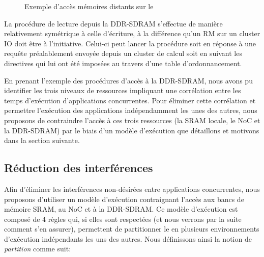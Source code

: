 \documentclass[main.tex]{subfiles}
\begin{document}
\begin{figure}
\begin{center}
    
	\caption{Exemple d'accès mémoires distants sur le \mppalong}
	\label{resumeFr_MPPAremoteMem}
\end{center}
\end{figure}
La procédure de lecture depuis la DDR-SDRAM s'effectue de manière relativement symétrique à celle d'écriture, à la différence qu'un RM sur un cluster IO doit être à l'initiative. Celui-ci peut lancer la procédure soit en réponse à une requête préalablement envoyée depuis un cluster de calcul soit en suivant les directives qui lui ont été imposées au travers d'une table d'ordonnancement.

En prenant l'exemple des procédures d'accès à la DDR-SDRAM, nous avons pu identifier les trois niveaux de ressources impliquant une corrélation entre les temps d'exécution d'applications concurrentes. Pour éliminer cette corrélation et permettre l'exécution des applications indépendamment les unes des autres, nous proposons de contraindre l'accès à ces trois ressources (la SRAM locale, le NoC et la DDR-SDRAM) par le biais d'un modèle d'exécution que détaillons et motivons dans la section suivante.



\subsection{Réduction des interférences}
\label{ssec_resumeFr_reducInterference}
Afin d'éliminer les interférences non-désirées entre applications concurrentes, nous proposons d'utiliser un modèle d'exécution contraignant l'accès aux bancs de mémoire SRAM, au NoC et à la DDR-SDRAM. Ce modèle d'exécution est composé de 4 règles qui, si elles sont respectées (et nous verrons par la suite comment s'en assurer), permettent de partitionner le \mppalong en plusieurs environnements d'exécution indépendants les uns des autres. Nous définissons ainsi la notion de \emph{partition} comme suit:
\end{document}

